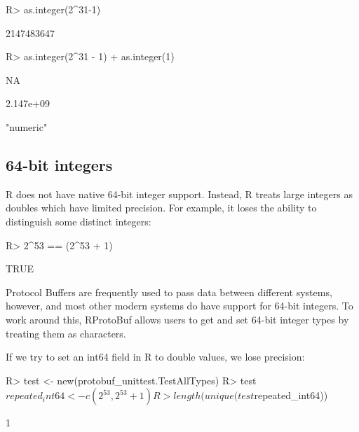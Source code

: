 \documentclass[article]{jss}
\begin{document}
\begin{Schunk}
\begin{Sinput}
R> as.integer(2^31-1)
\end{Sinput}
\begin{Soutput}
[1] 2147483647
\end{Soutput}
\end{Schunk}
\begin{Schunk}
\begin{Sinput}
R> as.integer(2^31 - 1) + as.integer(1)
\end{Sinput}
\end{Schunk}
\begin{Schunk}
\begin{Soutput}
[1] NA
\end{Soutput}
\begin{Soutput}
[1] 2.147e+09
\end{Soutput}
\begin{Soutput}
[1] "numeric"
\end{Soutput}
\end{Schunk}

\subsection{64-bit integers}
\label{sec:int64}

R does not have native 64-bit integer support.  Instead, R treats
large integers as doubles which have limited precision.  For example,
it loses the ability to distinguish some distinct integers:

\begin{Schunk}
\begin{Sinput}
R> 2^53 == (2^53 + 1)
\end{Sinput}
\begin{Soutput}
[1] TRUE
\end{Soutput}
\end{Schunk}

Protocol Buffers are frequently used to pass data between different
systems, however, and most other modern systems do have support for
64-bit integers.  To work around this, RProtoBuf allows users to get
and set 64-bit integer types by treating them as characters.


If we try to set an int64 field in R to double values, we lose
precision:

\begin{Schunk}
\begin{Sinput}
R> test <- new(protobuf_unittest.TestAllTypes)
R> test$repeated_int64 <- c(2^53, 2^53+1)
R> length(unique(test$repeated_int64))
\end{Sinput}
\begin{Soutput}
[1] 1
\end{Soutput}
\end{Schunk}
\end{document}

